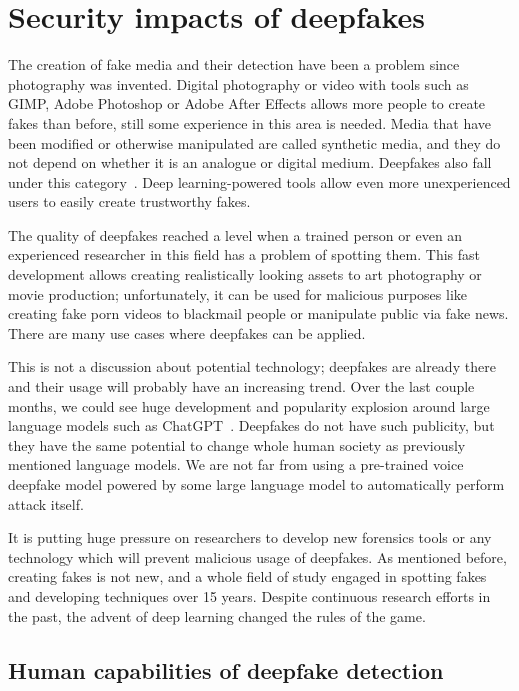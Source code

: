 \chapter{Security impacts of deepfakes}

The creation of fake media and their detection have been a problem since photography was invented. Digital photography or video with tools such as GIMP, Adobe Photoshop or Adobe After Effects allows more people to create fakes than before, still some experience in this area is needed. Media that have been modified or otherwise manipulated are called synthetic media, and they do not depend on whether it is an analogue or digital medium. Deepfakes also fall under this category~\cite{IncreasingThreatofDeepfakeIdentites}. Deep learning-powered tools allow even more unexperienced users to easily create trustworthy fakes. 

The quality of deepfakes reached a level when a trained person or even an experienced researcher in this field has a problem of spotting them. This fast development allows creating realistically looking assets to art photography or movie production; unfortunately, it can be used for malicious purposes like creating fake porn videos to blackmail people or manipulate public via fake news. There are many use cases where deepfakes can be applied.

This is not a discussion about potential technology; deepfakes are already there and their usage will probably have an increasing trend. Over the last couple months, we could see huge development and popularity explosion around large language models such as ChatGPT~\cite{ ChatGPTPopularity}. Deepfakes do not have such publicity, but they have the same potential to change whole human society as previously mentioned language models. We are not far from using a pre-trained voice deepfake model powered by some large language model to automatically perform attack itself.

It is putting huge pressure on researchers to develop new forensics tools or any technology which will prevent malicious usage of deepfakes. As mentioned before, creating fakes is not new, and a whole field of study engaged in spotting fakes and developing techniques over 15 years. Despite continuous research efforts in the past, the advent of deep learning changed the rules of the game.~\cite{MediaForensicsandDeepFakes}

\section{Human capabilities of deepfake detection}

